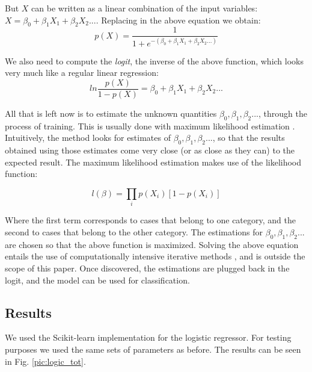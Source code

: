 But $X$ can be written as a linear combination of the input variables: $X = \beta_0 + \beta_1X_1 + \beta_2X_2 ... $. Replacing in the above equation we obtain:
\begin{equation*}
p(X) = \frac{1}{1+e^{-(\beta_0 + \beta_1X_1 + \beta_2X_2 ...)}}
\end{equation*}

We also need to compute the \textit{logit}, the inverse of the above function, which looks very much like a regular linear regression:
\begin{equation*}
ln\frac{p(X)}{1 - p(X)} = \beta_0 + \beta_1X_1 + \beta_2X_2 ...
\end{equation*}

All that is left now is to estimate the unknown quantities $\beta_0, \beta_1, \beta_2...$, through the process of training. This is usually done with maximum likelihood estimation \cite{menard2009logistic}. Intuitively, the method looks for estimates of $\beta_0, \beta_1, \beta_2...$, so that the results obtained using those estimates come very close (or as close as they can) to the expected result. The maximum likelihood estimation makes use of the likelihood function:

\begin{equation*}
l(\beta) = \prod_ip(X_i)[1 - p(X_i)]
\end{equation*}
 
Where the first term corresponds to cases that belong to one category, and the second to cases that belong to the other category. The estimations for $\beta_0, \beta_1, \beta_2...$ are chosen so that the above function is maximized. Solving the above equation entails the use of computationally intensive iterative methods \cite{logmodel1}, and is outside the scope of this paper. Once discovered, the estimations are plugged back in the logit, and the model can be used for classification.
 
\subsection{Results}

We used the Scikit-learn \cite{scikit-learn} implementation for the logistic regressor. For testing purposes we used the same sets of parameters as before. The results can be seen in Fig. \ref{pic:logic_tot}.

